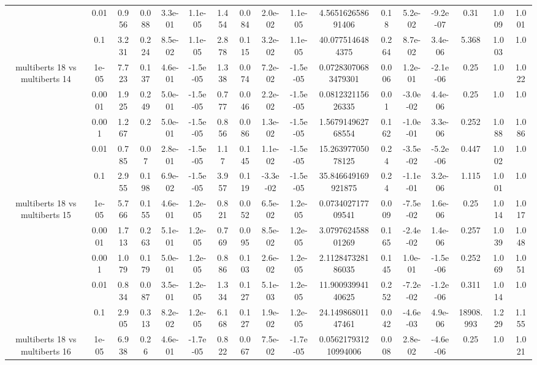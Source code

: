 \begin{tabular}{|c|c|c|c|c|c|c|c|c|c|c|c|c|c|c|c|c|}
 & 0.01 & 0.956 & 0.088 & 3.3e-01 & 1.1e-05 & 1.454 & 0.084 & 2.0e-02 & 1.1e-05 & 4.565162658691406 & 0.18 & 5.2e-02 & -9.2e-07 & 0.31 & 1.009 & 1.001 \\
 & 0.1 & 3.231 & 0.224 & 8.5e-02 & 1.1e-05 & 2.878 & 0.115 & 3.2e-02 & 1.1e-05 & 40.0775146484375 & 0.264 & 8.7e-02 & 3.4e-06 & 5.368 & 1.003 & 1.0 \\
\hline
\multirow{5}{*}{multiberts 18 vs multiberts 14} & 1e-05 & 7.723 & 0.137 & 4.6e-01 & -1.5e-05 & 1.338 & 0.074 & 7.2e-02 & -1.5e-05 & 0.07283070683479301 & 0.006 & 1.2e-01 & -2.1e-06 & 0.25 & 1.0 & 1.022 \\
 & 0.0001 & 1.925 & 0.249 & 5.0e-01 & -1.5e-05 & 0.777 & 0.046 & 2.2e-02 & -1.5e-05 & 0.081232115626335 & 0.01 & -3.0e-02 & 4.4e-06 & 0.25 & 1.0 & 1.0 \\
 & 0.001 & 1.267 & 0.2 & 5.0e-01 & -1.5e-05 & 0.856 & 0.086 & 1.3e-02 & -1.5e-05 & 1.567914962768554 & 0.162 & -1.0e-01 & 3.3e-06 & 0.252 & 1.088 & 1.086 \\
 & 0.01 & 0.785 & 0.07 & 2.8e-01 & -1.5e-05 & 1.17 & 0.145 & 1.1e-02 & -1.5e-05 & 15.26397705078125 & 0.24 & -3.5e-02 & -5.2e-06 & 0.447 & 1.002 & 1.0 \\
 & 0.1 & 2.955 & 0.198 & 6.9e-02 & -1.5e-05 & 3.957 & 0.119 & -3.3e-02 & -1.5e-05 & 35.846649169921875 & 0.24 & -1.1e-01 & 3.2e-06 & 1.115 & 1.001 & 1.0 \\
\hline
\multirow{5}{*}{multiberts 18 vs multiberts 15} & 1e-05 & 5.766 & 0.155 & 4.6e-01 & 1.2e-05 & 0.821 & 0.052 & 6.5e-02 & 1.2e-05 & 0.073402717709541 & 0.009 & -7.5e-02 & 1.6e-06 & 0.25 & 1.014 & 1.017 \\
 & 0.0001 & 1.713 & 0.263 & 5.1e-01 & 1.2e-05 & 0.769 & 0.095 & 8.5e-02 & 1.2e-05 & 3.079762458801269 & 0.165 & -2.4e-02 & 1.4e-06 & 0.257 & 1.039 & 1.048 \\
 & 0.001 & 1.079 & 0.179 & 5.0e-01 & 1.2e-05 & 0.886 & 0.103 & 2.6e-02 & 1.2e-05 & 2.112847328186035 & 0.145 & 1.0e-01 & -1.5e-06 & 0.252 & 1.069 & 1.051 \\
 & 0.01 & 0.834 & 0.087 & 3.5e-01 & 1.2e-05 & 1.334 & 0.127 & 5.1e-03 & 1.2e-05 & 11.90093994140625 & 0.252 & -7.2e-02 & -1.2e-06 & 0.311 & 1.014 & 1.0 \\
 & 0.1 & 2.905 & 0.313 & 8.2e-02 & 1.2e-05 & 6.168 & 0.127 & 1.9e-02 & 1.2e-05 & 24.14986801147461 & 0.042 & -4.6e-03 & 4.9e-06 & 18908.993 & 1.229 & 1.155 \\
\hline
\multirow{5}{*}{multiberts 18 vs multiberts 16} & 1e-05 & 6.938 & 0.26 & 4.6e-01 & -1.7e-05 & 0.822 & 0.067 & 7.5e-02 & -1.7e-05 & 0.056217931210994006 & 0.008 & 2.8e-02 & -4.6e-06 & 0.25 & 1.0 & 1.021 \\

\end{tabular}
